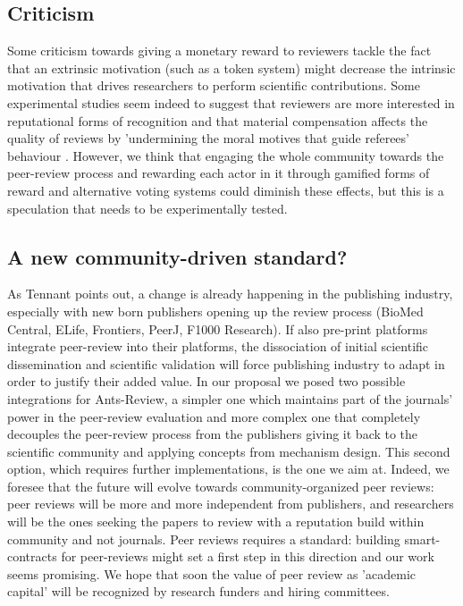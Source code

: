 \documentclass[runningheads]{llncs}
\begin{document}
\subsection{Criticism}
Some criticism towards giving a monetary reward to reviewers tackle the fact that an extrinsic motivation (such as a token system) might decrease the intrinsic motivation that drives researchers to perform scientific contributions. Some experimental studies seem indeed to suggest that reviewers are more interested in reputational forms of recognition \cite{Warne-RewRev,ZahIncent} and that material compensation affects the quality of reviews by 'undermining the moral motives that guide referees' behaviour \cite{SquazzIncent}. However, we think that engaging the whole community towards the peer-review process and rewarding each actor in it through gamified forms of reward and alternative voting systems could diminish these effects, but this is a speculation that needs to be experimentally tested.

\subsection{A new community-driven standard?}
As Tennant points out\cite{Tennant2017-F1000R}, a change is already happening in the publishing industry, especially with new born publishers opening up the review process (BioMed Central, ELife, Frontiers, PeerJ, F1000 Research). If also pre-print platforms integrate peer-review into their platforms, the dissociation of initial scientific dissemination and scientific validation will force publishing industry to adapt in order to justify their added value.
In our proposal we posed two possible integrations for Ants-Review, a simpler one which maintains part of the journals' power in the peer-review evaluation and more complex one that completely decouples the peer-review process from the publishers giving it back to the scientific community and applying concepts from mechanism design. This second option, which requires further implementations, is the one we aim at. Indeed, we foresee that the future will evolve towards community-organized peer reviews: peer reviews will be more and more independent from publishers, and researchers will be the ones seeking the papers to review with a reputation build within community and not journals.
Peer reviews requires a standard: building smart-contracts for peer-reviews might set a first step in this direction and our work seems promising. We hope that soon the value of peer review as 'academic capital' will be recognized by research funders and hiring committees.
\end{document}
